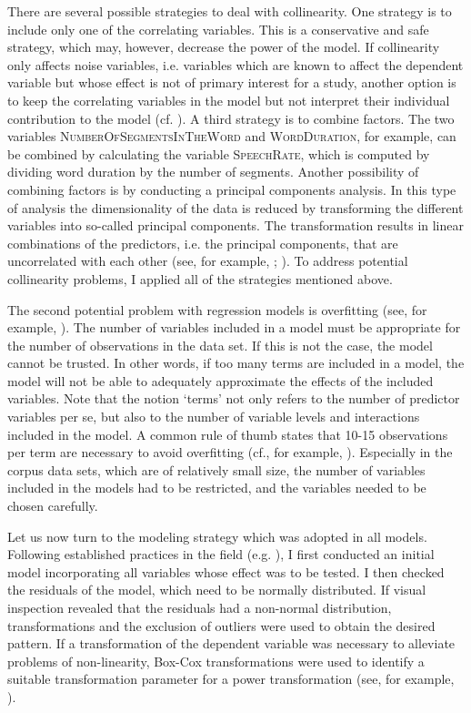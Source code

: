 There are several possible strategies to deal with collinearity. One strategy is to include only one of the correlating variables.  This is a conservative and safe strategy, which may, however, decrease the power of the model. If collinearity only affects noise variables, i.e. variables which are known to affect the dependent variable but whose effect is not of primary interest for a study, another option is to keep the correlating variables in the model but not interpret their individual contribution to the model (cf. \citealt{Wurm.2014}). A third strategy is to combine factors. The two variables \textsc{NumberOfSegmentsInTheWord } and \textsc{WordDuration}, for example, can be combined by calculating the variable \textsc{SpeechRate}, which is computed by dividing word duration by the number of segments. Another possibility of combining factors is by conducting a principal components analysis. In this type of analysis the dimensionality of the data is reduced by transforming the different variables into so-called principal components. The transformation results in linear combinations of the predictors, i.e. the principal components, that are uncorrelated with each other (see, for example, \citealt[chapter 5.1]{Baayen.2008}; \citealt[chapter 12]{Venables.2011}). To address potential collinearity problems, I applied all of the strategies mentioned above. 


 The second potential problem with regression models is overfitting (see, for example, \citealt{Draper.1998,Babyak.2004}). The number of variables included in a model must be appropriate for the number of observations in the data set. If this is not the case, the model cannot be trusted. In other words, if too many terms are included in a model, the model will not be able to adequately approximate the effects of the included variables. Note that the notion `terms' not only refers to the number of predictor variables per se, but also to the number of variable levels and interactions included in the model.  A common rule of thumb states that 10-15 observations per term are necessary to avoid overfitting (cf., for example, \citealt{Draper.1998}). Especially in the corpus data sets, which are of relatively small size, the number of variables included in the models had to be restricted, and the variables needed to be chosen carefully. 
 
Let us now turn to the modeling strategy which was adopted in all models. Following established practices in the field (e.g. \citealt{Baayen.2008}), I first conducted an initial model incorporating all variables whose effect was to be tested. I then checked the residuals of the model, which need to be normally distributed. If visual inspection revealed that the residuals had a non-normal distribution, transformations  and the exclusion of outliers were used to obtain the desired pattern. If a transformation of the dependent variable was necessary to alleviate problems of non-linearity, Box-Cox transformations were used to identify a suitable transformation parameter for a power transformation (see, for example, \citealt{Box.1964, Venables.2011}).

